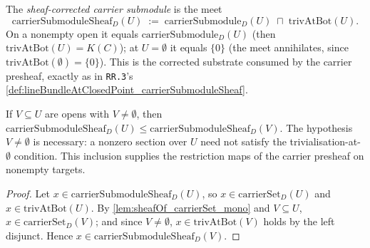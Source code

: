\begin{definition}

\leanok
[Sheaf-corrected carrier submodule enforcing \(F(\bot) = 0\)]
  \label{def:sheafOf_carrierSubmoduleSheaf}
  The \emph{sheaf-corrected carrier submodule} is the meet
  \[
    \mathrm{carrierSubmoduleSheaf}_D(U) \;:=\;
    \mathrm{carrierSubmodule}_D(U) \;\sqcap\; \mathrm{trivAtBot}(U).
  \]
  On a nonempty open it equals \(\mathrm{carrierSubmodule}_D(U)\) (then
  \(\mathrm{trivAtBot}(U) = K(C)\)); at \(U = \emptyset\) it equals \(\{0\}\)
  (the meet annihilates, since \(\mathrm{trivAtBot}(\emptyset) = \{0\}\)).
  This is the corrected substrate consumed by the carrier presheaf, exactly
  as in \texttt{RR.3}'s
  \cref{def:lineBundleAtClosedPoint_carrierSubmoduleSheaf}.
\end{definition}

\begin{lemma}

  \label{lem:sheafOf_carrierSubmoduleSheaf_le}
  If \(V \subseteq U\) are opens with \(V \ne \emptyset\), then
  \(\mathrm{carrierSubmoduleSheaf}_D(U) \le
  \mathrm{carrierSubmoduleSheaf}_D(V)\). The hypothesis \(V \ne \emptyset\)
  is necessary: a nonzero section over \(U\) need not satisfy the
  trivialisation-at-\(\emptyset\) condition. This inclusion supplies the
  restriction maps of the carrier presheaf on nonempty targets.
\end{lemma}

\begin{proof}
  Let \(x \in \mathrm{carrierSubmoduleSheaf}_D(U)\), so
  \(x \in \mathrm{carrierSet}_D(U)\) and \(x \in \mathrm{trivAtBot}(U)\). By
  \cref{lem:sheafOf_carrierSet_mono} and \(V \subseteq U\),
  \(x \in \mathrm{carrierSet}_D(V)\); and since \(V \ne \emptyset\),
  \(x \in \mathrm{trivAtBot}(V)\) holds by the left disjunct. Hence
  \(x \in \mathrm{carrierSubmoduleSheaf}_D(V)\).
\end{proof}

